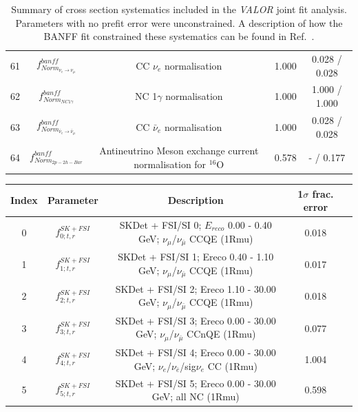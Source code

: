 {\begin{table}
\begin{tabular}{| c | c | c | c | c |}
61     &   $f_{Norm_{\nu_e \rightarrow \nu_\mu}}^{banff}$  & CC $\nu_{e}$ normalisation                                  & 1.000   & 0.028 / 0.028 \\ 
62     &   $f_{Norm_{NC1\gamma}}^{banff}$  & NC 1$\gamma$ normalisation                                  & 1.000   & 1.000 / 1.000 \\ 
63     &   $f_{Norm_{\bar{\nu}_e \rightarrow \bar{\nu}_\mu}}^{banff}$  & CC $\bar{\nu}_{e}$ normalisation                            & 1.000   & 0.028 / 0.028 \\ 
64     &    $f_{Norm_{2p-2h-Bar}}^{banff}$ & Antineutrino Meson exchange current normalisation for $^{16}$O& 0.578   & - / 0.177 \\ 

\hline

\end{tabular}

\caption{
Summary of cross section systematics included in the {\em VALOR} joint fit analysis. Parameters with no prefit error were unconstrained.
A description of how the BANFF fit constrained these systematics can be found in Ref.~\cite{BANFF2015}.
}
\label{tab:banff_uncertainties_xsec}

\end{table}




\begin{table}

\begin{tabular}{| c | c | c | c | c |}
\hline
           Index & Parameter & Description & 1$\sigma$ frac. error \\
        
\hline

0     &  $f_{0; t, r}^{SK+FSI}$    & SKDet + FSI/SI  0; $E_{reco}$ 0.00 - 0.40 GeV; $\nu_{\mu}$/$\nu_{\bar{\mu}}$ CCQE (1Rmu)                  & 0.018      \\ 
1     &  $f_{1; t, r}^{SK+FSI}$    & SKDet + FSI/SI  1; Ereco  0.40 - 1.10 GeV; $\nu_{\mu}$/$\nu_{\bar{\mu}}$ CCQE (1Rmu)                  & 0.017      \\ 
2     &  $f_{2; t, r}^{SK+FSI}$    & SKDet + FSI/SI  2; Ereco 1.10 - 30.00 GeV; $\nu_{\mu}$/$\nu_{\bar{\mu}}$ CCQE (1Rmu)                 & 0.018      \\ 
3     &  $f_{3; t, r}^{SK+FSI}$    & SKDet + FSI/SI  3; Ereco 0.00 - 30.00 GeV; $\nu_{\mu}$/$\nu_{\bar{\mu}}$ CCnQE (1Rmu)                & 0.077      \\ 
4     &  $f_{4; t, r}^{SK+FSI}$    & SKDet + FSI/SI  4; Ereco 0.00 - 30.00 GeV; $\nu_e$/$\nu_{\bar{e}}$/sig$\nu_e$ CC (1Rmu)              & 1.004      \\ 
5     &  $f_{5; t, r}^{SK+FSI}$    & SKDet + FSI/SI  5; Ereco 0.00 - 30.00 GeV; all NC (1Rmu)                            & 0.598      \\ 


\end{tabular}
\end{table}}
